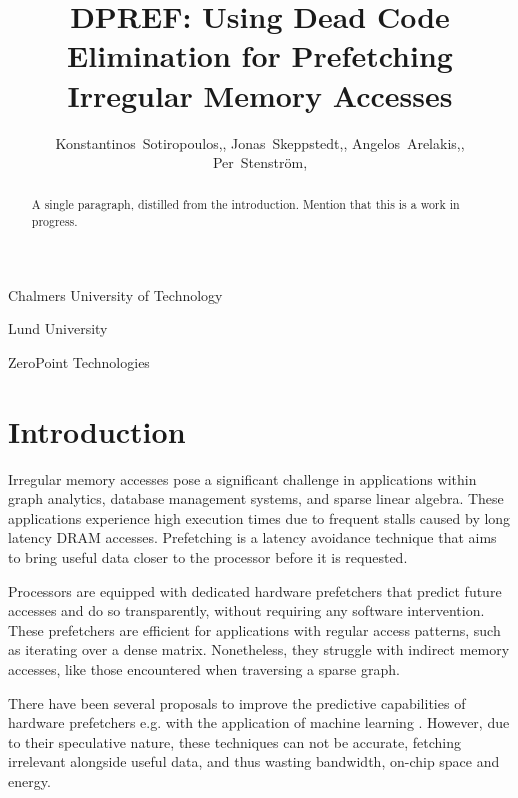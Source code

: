 \documentclass{acaces}
\begin{document}
\title{DPREF: Using Dead Code Elimination for Prefetching Irregular Memory Accesses}

\author{
Konstantinos~Sotiropoulos,,
Jonas~Skeppstedt,,
Angelos~Arelakis,,
Per~Stenström,
}

\address{1}{
  Chalmers University of Technology
}

\address{2}{
  Lund University
}

\address{3}{
  ZeroPoint Technologies
}


\pagestyle{empty}

\begin{abstract}
  A single paragraph, distilled from the introduction.
  Mention that this is a work in progress.
\end{abstract}


\section{Introduction}

Irregular memory accesses pose a significant challenge in applications within graph analytics, database management systems, and sparse linear algebra.
These applications experience high execution times due to frequent stalls caused by long latency DRAM accesses.
Prefetching is a latency avoidance technique that aims to bring useful data closer to the processor before it is requested.

Processors are equipped with dedicated hardware prefetchers that predict future accesses and do so transparently, without requiring any software intervention.
These prefetchers are efficient for applications with regular access patterns, such as iterating over a dense matrix.
Nonetheless, they struggle with indirect memory accesses, like those encountered when traversing a sparse graph.

There have been several proposals to improve the predictive capabilities of hardware prefetchers e.g. with the application of machine learning \cite{bera_pythia_2021}.
However, due to their speculative nature, these techniques can not be accurate, fetching irrelevant alongside useful data, and thus wasting bandwidth, on-chip space and energy.
\end{document}
